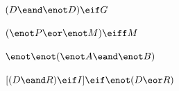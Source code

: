 \begin{compactlist}

\item	$(D \eand \enot D) \eif G $




\item	$(\enot P \eor \enot M) \eiff M $




\item	$\enot \enot (\enot A \eand \enot B)  $




\item 	$[(D \eand R) \eif I] \eif \enot(D \eor R) $


\end{compactlist}

